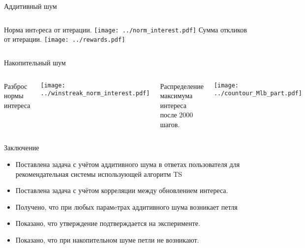 \documentclass{beamer}
\begin{document}
\begin{frame}{Аддитивный шум} 
\begin{columns}[T]
Норма интeреса от итерации.
\texttt{[image: ../norm\_interest.pdf]}
Сумма откликов от итерации.  
\texttt{[image: ../rewards.pdf]}
\end{columns}

\end{frame}
\begin{frame}{Накопительный шум}
\begin{columns}[T]

Разброс нормы интереса
\begin{center}
  \texttt{[image: ../winstreak\_norm\_interest.pdf]}
\end{center}
Распределение максимума интереса после $2000$ шагов.
\begin{center}
  \texttt{[image: ../countour\_Mlb\_part.pdf]}
\end{center}
\end{columns}
\end{frame}
\begin{frame}{Заключение}
  \begin{itemize}
      \item Поставлена задача с учётом аддитивного шума в ответах пользователя для рекомендательная системы использующей алгоритм TS
      \item Поставлена задача с учётом корреляции между обновлением интереса. 
      \item Получено, что при любых парамeтрах аддитивного шума возникает петля  
      \item Показано, что утверждение подтверждается на эксперименте.
      \item Показано, что при накопительном шуме петли не возникают.
  \end{itemize}
\end{frame}
\end{document}

